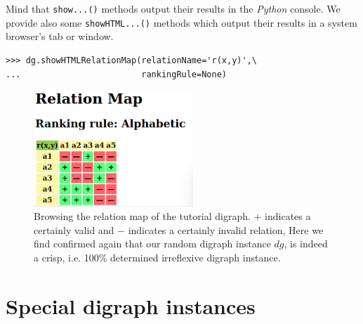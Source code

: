 Mind that \texttt{show...()} methods output their results in the \emph{Python} console. We provide also some \texttt{showHTML...()} methods which output their results in a system browser’s tab or window.
\begin{lstlisting}
>>> dg.showHTMLRelationMap(relationName='r(x,y)',\
...                        rankingRule=None)
\end{lstlisting}
\begin{figure}[h]
\sidecaption[t]
\includegraphics[width=6cm]{Figures/relationMap1.png}
\caption{Browsing the relation map of the tutorial digraph. $+$ indicates a certainly valid and $-$ indicates a certainly  invalid relation, Here we find confirmed again that our random digraph instance $dg$, is indeed a crisp, i.e. 100\% determined irreflexive digraph instance.}
\label{fig:1.2}       %
\end{figure}

\section{Special digraph instances}
\label{sec:1.5}

